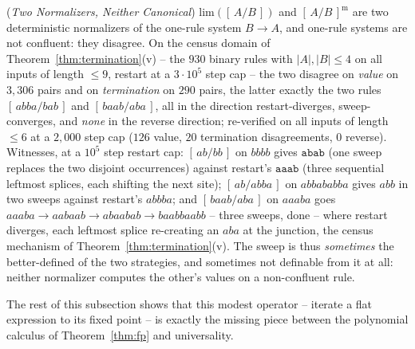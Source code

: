 \begin{remark}
    (\emph{Two Normalizers, Neither Canonical})
    \label{rem:limstrategies}
    $\mathrm{lim}([\,A/B\,])$ and $[\,A/B\,]^{\mathrm{m}}$ are two
    deterministic normalizers of the one-rule system $B \to A$, and
    one-rule systems are not confluent: they disagree. On the census
    domain of Theorem~\ref{thm:termination}(v) -- the $930$ binary rules
    with $|A|, |B| \leq 4$ on all inputs of length $\leq 9$, restart at
    a $3 \cdot 10^5$ step cap -- the two disagree on \emph{value} on
    $3{,}306$ pairs and on \emph{termination} on $290$ pairs, the latter
    exactly the two rules $[\,abba/bab\,]$ and $[\,baab/aba\,]$, all in
    the direction restart-diverges, sweep-converges, and \emph{none} in
    the reverse direction; re-verified on all inputs of length $\leq 6$
    at a $2{,}000$ step cap ($126$ value, $20$ termination disagreements,
    $0$ reverse). Witnesses, at a $10^5$ step restart cap:
    $[\,ab/bb\,]$ on $bbbb$ gives $\mathtt{abab}$ (one sweep replaces
    the two disjoint occurrences) against restart's $\mathtt{aaab}$
    (three sequential leftmost splices, each shifting the next site);
    $[\,ab/abba\,]$ on $abbababba$ gives $abb$ in two sweeps against
    restart's $abbba$; and $[\,baab/aba\,]$ on $aaaba$ goes
    $aaaba \to aabaab \to abaabab \to baabbaabb$ -- three sweeps, done --
    where restart diverges, each leftmost splice re-creating an $aba$ at
    the junction, the census mechanism of
    Theorem~\ref{thm:termination}(v). The sweep is thus
    \emph{sometimes} the better-defined of the two strategies, and
    sometimes not definable from it at all: neither normalizer computes
    the other's values on a non-confluent rule.
\end{remark}

The rest of this subsection shows that this modest operator -- iterate a
flat expression to its fixed point -- is exactly the missing piece
between the polynomial calculus of Theorem~\ref{thm:fp} and universality.

